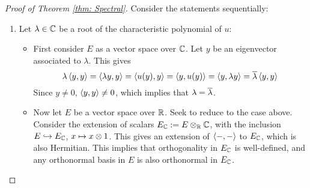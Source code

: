 \begin{proof}[Proof of Theorem \ref{thm: Spectral}]
    Consider the statements sequentially:
    \begin{enumerate}[label=\roman*)]
        \item Let $\lambda \in \mathbb{C}$ be a root of the characteristic polynomial of $u$:
        \begin{itemize}
            \item First consider $E$ as a vector space over $\mathbb{C}$. Let $y$ be an eigenvector associated to $\lambda$. This gives
            \[
                \lambda \left\langle y, y \right\rangle = \left\langle \lambda y, y \right\rangle = \left\langle u(y), y \right\rangle = \left\langle y, u(y) \right\rangle = \left\langle y, \lambda y \right\rangle = \overline{\lambda} \left\langle y, y \right\rangle
            \]
            Since $y \neq 0$, $\left\langle y, y \right\rangle \neq 0$, which implies that $\lambda = \overline{\lambda}$.
            \item Now let $E$ be a vector space over $\mathbb{R}$. Seek to reduce to the case above. Consider the extension of scalars $E_{\mathbb{C}} := E \otimes_{\mathbb{R}} \mathbb{C}$, with the inclusion $E \hookrightarrow E_{\mathbb{C}}$, $x \mapsto x \otimes 1$. This gives an extension of $\left\langle -, - \right\rangle$ to $E_{\mathbb{C}}$, which is also Hermitian. This implies that orthogonality in $E_{\mathbb{C}}$ is well-defined, and any orthonormal basis in $E$ is also orthonormal in $E_{\mathbb{C}}$.
            

\end{itemize}
\end{enumerate}
\end{proof}

